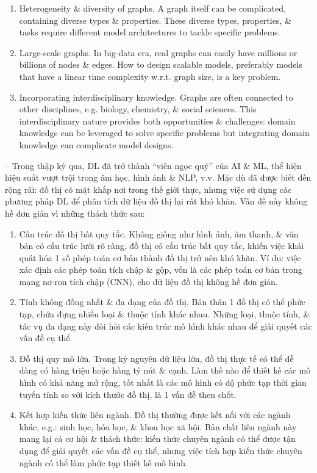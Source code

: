 \documentclass{article}
\begin{document}
\begin{itemize}
\begin{itemize}
\begin{enumerate}
            \item Heterogeneity \& diversity of graphs. A graph itself can be complicated, containing diverse types \& properties. These diverse types, properties, \& tasks require different model architectures to tackle specific problems.
            \item Large-scale graphs. In big-data era, real graphs can easily have millions or billions of nodes \& edges. How to design scalable models, preferably models that have a linear time complexity w.r.t. graph size, is a key problem.
            \item Incorporating interdisciplinary knowledge. Graphs are often connected to other disciplines, e.g. biology, chemistry, \& social sciences. This interdisciplinary nature provides both opportunities \& challenges: domain knowledge can be leveraged to solve specific problems but integrating domain knowledge can complicate model designs.
        \end{enumerate}
        -- Trong thập kỷ qua, DL đã trở thành ``viên ngọc quý'' của AI \& ML, thể hiện hiệu suất vượt trội trong âm học, hình ảnh \& NLP, v.v. Mặc dù đã được biết đến rộng rãi: đồ thị có mặt khắp nơi trong thế giới thực, nhưng việc sử dụng các phương pháp DL để phân tích dữ liệu đồ thị lại rất khó khăn. Vấn đề này không hề đơn giản vì những thách thức sau:
        \begin{enumerate}
            \item Cấu trúc đồ thị bất quy tắc. Không giống như hình ảnh, âm thanh, \& văn bản có cấu trúc lưới rõ ràng, đồ thị có cấu trúc bất quy tắc, khiến việc khái quát hóa 1 số phép toán cơ bản thành đồ thị trở nên khó khăn. Ví dụ: việc xác định các phép toán tích chập \& gộp, vốn là các phép toán cơ bản trong mạng nơ-ron tích chập (CNN), cho dữ liệu đồ thị không hề đơn giản.
            \item Tính không đồng nhất \& đa dạng của đồ thị. Bản thân 1 đồ thị có thể phức tạp, chứa đựng nhiều loại \& thuộc tính khác nhau. Những loại, thuộc tính, \& tác vụ đa dạng này đòi hỏi các kiến trúc mô hình khác nhau để giải quyết các vấn đề cụ thể.
            \item Đồ thị quy mô lớn. Trong kỷ nguyên dữ liệu lớn, đồ thị thực tế có thể dễ dàng có hàng triệu hoặc hàng tỷ nút \& cạnh. Làm thế nào để thiết kế các mô hình có khả năng mở rộng, tốt nhất là các mô hình có độ phức tạp thời gian tuyến tính so với kích thước đồ thị, là 1 vấn đề then chốt.
            \item Kết hợp kiến thức liên ngành. Đồ thị thường được kết nối với các ngành khác, e.g.: sinh học, hóa học, \& khoa học xã hội. Bản chất liên ngành này mang lại cả cơ hội \& thách thức: kiến thức chuyên ngành có thể được tận dụng để giải quyết các vấn đề cụ thể, nhưng việc tích hợp kiến thức chuyên ngành có thể làm phức tạp thiết kế mô hình.

\end{enumerate}
\end{itemize}
\end{itemize}
\end{document}
